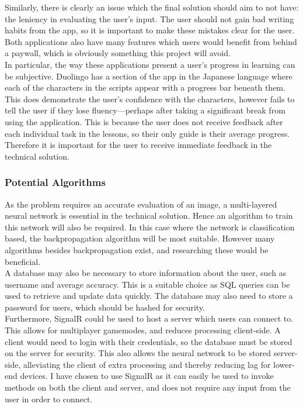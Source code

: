 \documentclass{article}
\begin{document}
Similarly, there is clearly an issue which the final solution should aim to not have: the leniency in evaluating the user's input. The user should not gain bad writing habits from the app, so it is important to make these mistakes clear for the user. Both applications also have many features which users would benefit from behind a paywall, which is obviously something this project will avoid. \\

In particular, the way these applications present a user's progress in learning can be subjective. Duolingo has a section of the app in the Japanese language where each of the characters in the scripts appear with a progress bar beneath them. This does demonstrate the user's confidence with the characters, however fails to tell the user if they lose fluency---perhaps after taking a significant break from using the application. This is because the user does not receive feedback after each individual task in the lessons, so their only guide is their average progress. Therefore it is important for the user to receive immediate feedback in the technical solution.

\subsubsection{Potential Algorithms}

As the problem requires an accurate evaluation of an image, a multi-layered neural network is essential in the technical solution. Hence an algorithm to train this network will also be required. In this case where the network is classification based, the backpropagation algorithm will be most suitable. However many algorithms besides backpropagation exist, and researching these would be beneficial. \\

A database may also be necessary to store information about the user, such as username and average accuracy. This is a suitable choice as SQL queries can be used to retrieve and update data quickly. The database may also need to store a password for users, which should be hashed for security. \\

Furthermore, SignalR could be used to host a server which users can connect to. This allows for multiplayer gamemodes, and reduces processing client-side. A client would need to login with their credentials, so the database must be stored on the server for security. This also allows the neural network to be stored server-side, alleviating the client of extra processing and thereby reducing lag for lower-end devices. I have chosen to use SignalR as it can easily be used to invoke methods on both the client and server, and does not require any input from the user in order to connect. \\
\end{document}
